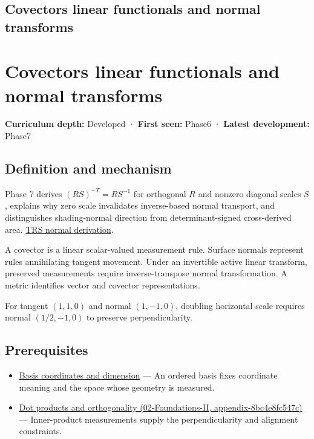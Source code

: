 \hypertarget{appendix-46da295c6787}{}
\section*{Covectors linear functionals and normal transforms}
\chapter{Covectors linear functionals and normal transforms}\label{appendix-46da295c6787-covectors-linear-functionals-and-normal-transforms}

\textbf{Curriculum depth:} Developed · \textbf{First seen:} Phase6 · \textbf{Latest development:} Phase7

\section{Definition and mechanism}\label{appendix-46da295c6787-definition-and-mechanism}

Phase 7 derives \((RS)^{-T}=RS^{-1}\) for orthogonal \(R\) and nonzero diagonal scales \(S\), explains why zero scale invalidates inverse-based normal transport, and distinguishes shading-normal direction from determinant-signed cross-derived area. \href{Continuous\%20Notes/Computing\%20Foundations\%20-\%20From\%20Bits\%20to\%20C++\%20and\%20Systems\%20APIs\#Normals\%20undo\%20scale\%20before\%20following\%20rotation}{TRS normal derivation}.

A covector is a linear scalar-valued measurement rule. Surface normals represent rules annihilating tangent movement. Under an invertible active linear transform, preserved measurements require inverse-transpose normal transformation. A metric identifies vector and covector representations.

For tangent \((1,1,0)\) and normal \((1,-1,0)\), doubling horizontal scale requires normal \((1/2,-1,0)\) to preserve perpendicularity.

\section{Prerequisites}\label{appendix-46da295c6787-prerequisites}

\begin{itemize}
\tightlist
\item
  \hyperref[appendix-ce0341f7ea0d]{Basis coordinates and dimension} --- An ordered basis fixes coordinate meaning and the space whose geometry is measured.
\item
  \href{../02-Foundations-II/main.pdf\#nameddest=appendix-8bc4e8fc547c}{Dot products and orthogonality (02-Foundations-II, appendix-8bc4e8fc547c)} --- Inner-product measurements supply the perpendicularity and alignment constraints.
\end{itemize}

